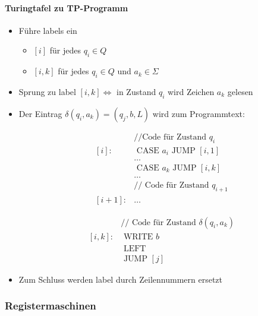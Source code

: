 \documentclass{scrartcl}
\begin{document}
\paragraph{Turingtafel zu TP-Programm}

\begin{itemize}
	\item Führe labels ein
	\begin{itemize}
		\item $[i]$ für jedes $q_i \in Q$
		\item $[i,k]$ für jedes $q_i \in Q$ und $a_k \in \Sigma$
	\end{itemize}
	\item Sprung zu label $[i,k] \iff$ in Zustand $q_i$ wird Zeichen $a_k$ gelesen
	\item Der Eintrag $\delta(q_i,a_k) = (q_j,b,L)$ wird zum Programmtext: \\
	\begin{minipage}{.5\linewidth}
		\begin{align*}
			& \text{//Code für Zustand } q_i \\
			[i]: & \text{ CASE } a_i \text{ JUMP } [i,1] \\
			& \ldots \\
			& \text{ CASE } a_k \text{ JUMP } [i,k] \\
			& \ldots \\
			& \text{// Code für Zustand } q_{i+1} \\
			[i+1]: & \ldots
		\end{align*}
	\end{minipage}
	\begin{minipage}{.5\linewidth}
		\begin{align*}
			& \text{// Code für Zustand } \delta(q_i,a_k) \\
			[i,k]: & \text{ WRITE } b \\
			& \text{ LEFT} \\
			& \text{ JUMP } [j]
		\end{align*}
	\end{minipage}
	\item Zum Schluss werden label durch Zeilennummern ersetzt
\end{itemize}

\subsubsection{Registermaschinen}
\end{document}
